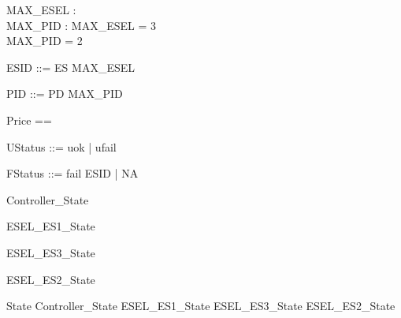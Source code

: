 \documentclass{article}
\begin{document}

\begin{axdef}
	MAX\_ESEL : \nat \\
 MAX\_PID : \nat 
\where
 MAX\_ESEL = 3 \\
 MAX\_PID = 2
\end{axdef}

\begin{zed}
	ESID ::= ES  \upto MAX\_ESEL \rdata
\end{zed}

\begin{zed}
	PID ::= PD  \upto MAX\_PID \rdata
\end{zed}

\begin{zed}
	Price == \nat
\end{zed}

\begin{zed}
	UStatus ::= uok | ufail
\end{zed}

\begin{zed}
	FStatus ::= fail \ldata ESID \rdata | NA
\end{zed}

\begin{zed}
	Controller\_State 
\end{zed}

\begin{zed}
	ESEL\_ES1\_State 
\end{zed}

\begin{zed}
	ESEL\_ES3\_State 
\end{zed}

\begin{zed}
	ESEL\_ES2\_State 
\end{zed}

\begin{zed}
	State  Controller\_State \land ESEL\_ES1\_State \land ESEL\_ES3\_State \land ESEL\_ES2\_State
\end{zed}
\end{document}
